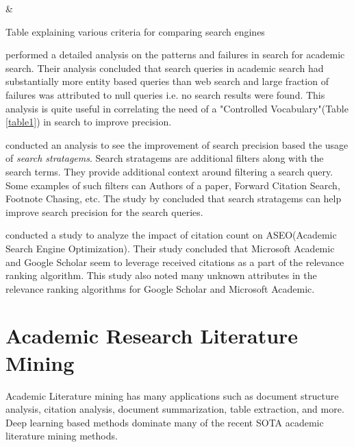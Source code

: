 \begin{table}[h]
    \label{table\arabic{tablecounter}}
            {\Criteria & \Meaning}
            \centering
            \caption{\label{tablecounter}Table explaining various criteria for comparing search engines}
\end{table}



\cite{li2017investigating} performed a detailed analysis on the patterns and failures in search for academic search. 
Their analysis concluded that search queries in academic search had substantially more entity based queries than web search and 
large fraction of failures was attributed to null queries i.e. no search results were found. 
This analysis is quite useful in correlating the need of a "Controlled Vocabulary"(Table \ref{table1}) in search to improve precision. 

\cite{kacem2018analysis} conducted an analysis to see the improvement of search precision based the usage of \textit{search stratagems}.
Search stratagems are additional filters along with the search terms. They provide additional context around filtering a search query. 
Some examples of such filters can Authors of a paper, Forward Citation Search, Footnote Chasing, etc.
The study by \cite{kacem2018analysis} concluded that search stratagems can help improve search precision for the search queries.

\cite{rovira2019ranking} conducted a study to analyze the impact of citation count on ASEO(Academic Search Engine Optimization). 
Their study concluded that Microsoft Academic and Google Scholar seem to leverage received citations as a part of the relevance 
ranking algorithm. This study also noted many unknown attributes in the relevance ranking algorithms for Google Scholar and Microsoft Academic.


\section{Academic Research Literature Mining}
\label{relatedwork:acad-lit-mining}
Academic Literature mining has many applications such as document structure analysis, citation analysis, document summarization, table extraction, and more. Deep learning based methods dominate many of the recent SOTA academic literature mining methods. 

